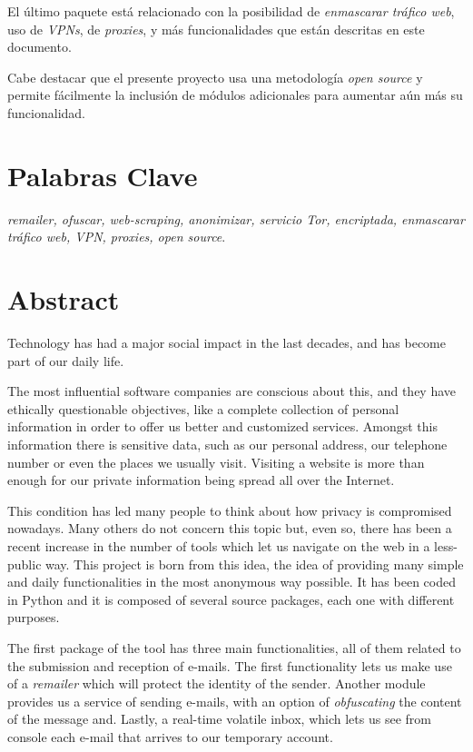 El último paquete está relacionado con la posibilidad de
\textit{enmascarar tráfico web}, uso de \textit{VPNs}, de
\textit{proxies}, y más funcionalidades que están descritas en este
documento.

Cabe destacar que el presente proyecto usa una metodología
\textit{open source} y permite fácilmente la inclusión de módulos
adicionales para aumentar aún más su funcionalidad.

\section*{Palabras Clave}
\textit{remailer, ofuscar, web-scraping, anonimizar, servicio Tor, encriptada, enmascarar tráfico web, VPN, proxies, open source}.
\newpage

\section*{Abstract}
Technology has had a major social impact in the last decades, and has become part of our daily life.

The most influential software companies are conscious about this, and
they have ethically questionable objectives, like a complete
collection of personal information in order to offer us better and
customized services. Amongst this information there is
sensitive data, such as our personal address, our telephone
number or even the places we usually visit.  Visiting a
  website is more than enough for our private information being spread
  all over the Internet.

This condition has led many people to think about how privacy is
compromised nowadays. Many others do not concern this topic but, even so, there
has been a recent increase in the number of tools which let us
navigate on the web in a less-public way. This project is born from
this idea, the idea of providing many simple and daily functionalities
in the most anonymous way possible. It has been coded in Python and it
is composed of several source packages, each one with different
purposes.

The first package of the tool has three main functionalities, all of
them related to the submission and reception of e-mails. The first
functionality lets us make use of a \textit{remailer} which will
protect the identity of the sender. Another module provides us a
service of sending e-mails, with an option of \textit{obfuscating} the
content of the message and. Lastly, a real-time volatile inbox, which
lets us see from console each e-mail that arrives to our temporary
account.

